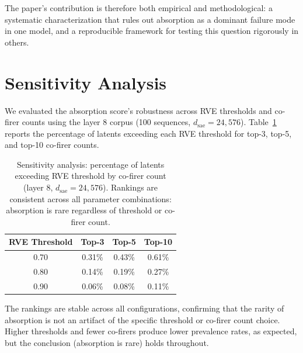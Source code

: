 \documentclass{article}
\begin{document}
The paper's contribution is therefore both empirical and methodological: a systematic characterization that rules out absorption as a dominant failure mode in one model, and a reproducible framework for testing this question rigorously in others.


\appendix

\section{Sensitivity Analysis}
\label{appendix:sensitivity}

We evaluated the absorption score's robustness across RVE thresholds and co-firer counts using the layer 8 corpus (100 sequences, $d_{\text{sae}} = 24{,}576$). Table~\ref{tab:sensitivity} reports the percentage of latents exceeding each RVE threshold for top-3, top-5, and top-10 co-firer counts.

\begin{table}[t]
\caption{Sensitivity analysis: percentage of latents exceeding RVE threshold by co-firer count (layer 8, $d_{\text{sae}} = 24{,}576$). Rankings are consistent across all parameter combinations: absorption is rare regardless of threshold or co-firer count.}
\label{tab:sensitivity}
\centering
\begin{tabular}{cccc}
\toprule
RVE Threshold & Top-3 & Top-5 & Top-10 \\
\midrule
0.70 & 0.31\% & 0.43\% & 0.61\% \\
0.80 & 0.14\% & 0.19\% & 0.27\% \\
0.90 & 0.06\% & 0.08\% & 0.11\% \\
\bottomrule
\end{tabular}
\end{table}

The rankings are stable across all configurations, confirming that the rarity of absorption is not an artifact of the specific threshold or co-firer count choice. Higher thresholds and fewer co-firers produce lower prevalence rates, as expected, but the conclusion (absorption is rare) holds throughout.




\end{document}
